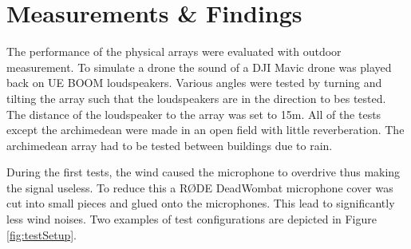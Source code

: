 \section{Measurements \& Findings} \label{sec:array_prototype_measurements}
The performance of the physical arrays were evaluated with outdoor measurement.
To simulate a drone the sound of a DJI Mavic drone  was played back on 
UE BOOM loudspeakers.
Various angles were tested by turning and tilting the array such that 
the loudspeakers are in the direction to bes tested.
The distance of the loudspeaker to the array was set to 
15m.
All of the tests except the archimedean were made in an open field with little reverberation.
The archimedean array had to be tested between buildings due to rain.

During the first tests, the wind caused the microphone to overdrive
thus making the signal useless.
To reduce this a RØDE DeadWombat microphone cover was cut into small pieces
and glued onto the microphones.
This lead to significantly less wind noises.
Two examples of test configurations are depicted in Figure \ref*{fig:testSetup}.
